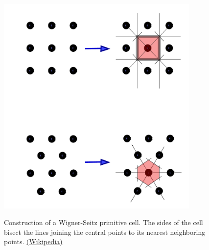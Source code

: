 \documentclass{Textbook}
\begin{document}
\begin{figure}[!ht] 
  \centering
  \includegraphics[width=10cm]{ws_2d2.pdf}\\
  \caption{Construction of a Wigner-Seitz primitive cell. The sides of the cell bisect the lines joining the central points to its nearest neighboring points. \href{http://en.wikipedia.org/wiki/Wigner\%E2\%80\%93Seitz_cell}{(Wikipedia)}}
  \label{fig:wigner_seitz_2d}
\end{figure}


\end{document}
